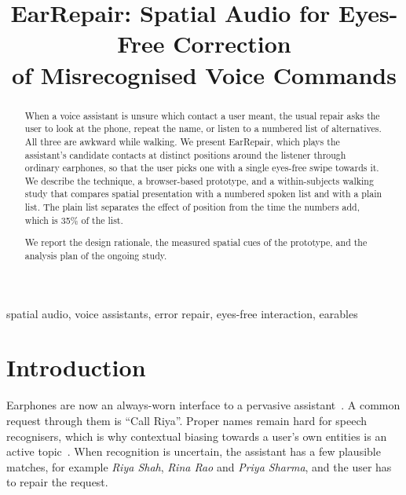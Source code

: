 \documentclass[conference,letterpaper]{IEEEtran}
\newcommand{\todo}[1]{\textcolor{red}{[TODO: #1]}}
\newif\ifhaveresults
\begin{document}
\title{EarRepair: Spatial Audio for Eyes-Free Correction\\ of Misrecognised Voice Commands}

\author{\IEEEauthorblockN{\todo{Author names}}
\IEEEauthorblockA{\todo{Department, institution, city, country}\\
\todo{email addresses}}}

\maketitle

\begin{abstract}
When a voice assistant is unsure which contact a user meant, the usual repair asks the user to look at
the phone, repeat the name, or listen to a numbered list of alternatives. All three are awkward while
walking. We present EarRepair, which plays the assistant's candidate contacts at distinct positions
around the listener through ordinary earphones, so that the user picks one with a single eyes-free
swipe towards it. We describe the technique, a browser-based prototype, and a within-subjects walking
study that compares spatial presentation with a numbered spoken list and with a plain list. The plain
list separates the effect of position from the time the numbers add, which is 35\% of the list.
\ifhaveresults
In a pilot with \resN{} participants, \todo{one-sentence summary of the main result, written after the analysis}.
\else
We report the design rationale, the measured spatial cues of the prototype, and the analysis plan of
the ongoing study.
\fi
\end{abstract}

\begin{IEEEkeywords}
spatial audio, voice assistants, error repair, eyes-free interaction, earables
\end{IEEEkeywords}

\section{Introduction}
Earphones are now an always-worn interface to a pervasive assistant~\cite{roddiger2022sensing}. A
common request through them is ``Call Riya''. Proper names remain hard for speech recognisers, which
is why contextual biasing towards a user's own entities is an active topic~\cite{zhao2019shallow}.
When recognition is uncertain, the assistant has a few plausible matches, for example
\emph{Riya Shah}, \emph{Rina Rao} and \emph{Priya Sharma}, and the user has to repair the request.
\end{document}
